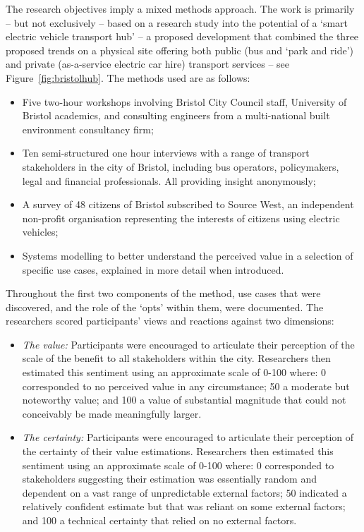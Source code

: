 \documentclass[b5paper,10pt]{article}
\begin{document}
The research objectives imply a mixed methods approach. The work is
primarily -- but not exclusively -- based on a research study into the
potential of a `smart electric vehicle transport hub' -- a proposed
development that combined the three proposed trends on a physical site
offering both public (bus and `park and ride') and private
(as-a-service electric car hire) transport services -- see
Figure~\ref{fig:bristolhub}. The methods used are as follows:

\begin{itemize}
\item Five two-hour workshops involving Bristol City Council staff,
University of Bristol academics, and consulting engineers from a
multi-national built environment consultancy firm;
\item Ten semi-structured one hour interviews with a range of
transport stakeholders in the city of Bristol, including bus
operators, policymakers, legal and financial professionals. All
providing insight anonymously;
\item A survey of 48 citizens of Bristol subscribed to Source West, an
independent non-profit organisation representing the interests of
citizens using electric vehicles;
\item Systems modelling to better understand the perceived value in a
selection of specific use cases, explained in more detail when
introduced.
\end{itemize}

Throughout the first two components of the method, use cases that were
discovered, and the role of the `opts' within them, were
documented. The researchers scored participants' views and reactions
against two dimensions:

\begin{itemize}
\item {\emph{The value:}} Participants were encouraged to articulate their
perception of the scale of the benefit to all stakeholders within the
city. Researchers then estimated this sentiment using an approximate
scale of 0-100 where: 0 corresponded to no perceived value in any
circumstance; 50 a moderate but noteworthy value; and 100 a value of
substantial magnitude that could not conceivably be made meaningfully larger.
\item {\emph{The certainty:}} Participants were encouraged to articulate
their perception of the certainty of their value estimations. Researchers then
estimated this sentiment using an approximate scale of 0-100 where: 0
corresponded to stakeholders suggesting their estimation was
essentially random and dependent on a vast range of unpredictable
external factors; 50 indicated a relatively confident estimate but that was
reliant on some external factors; and 100 a technical certainty that
relied on no external factors.
\end{itemize}
\end{document}
